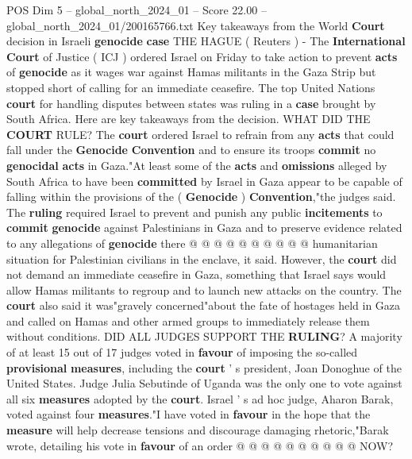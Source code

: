 \begin{textsample}{POS Dim 5 – global\_north\_2024\_01 – Score 22.00 – global\_north\_2024\_01/200165766.txt}  \label{ex:f5_pos_132}
Key takeaways from the World \textbf{Court} decision in Israeli \textbf{genocide} \textbf{case} THE HAGUE ( Reuters ) - The \textbf{International} \textbf{Court} of Justice ( ICJ ) ordered Israel on Friday to take action to prevent \textbf{acts} of \textbf{genocide} as it wages war against Hamas militants in the Gaza Strip but stopped short of calling for an immediate ceasefire.
The top United Nations \textbf{court} for handling disputes between states was ruling in a \textbf{case} brought by South Africa.
Here are key takeaways from the decision.
WHAT DID THE \textbf{COURT} RULE?
The \textbf{court} ordered Israel to refrain from any \textbf{acts} that could fall under the \textbf{Genocide} \textbf{Convention} and to ensure its troops \textbf{commit} no \textbf{genocidal} \textbf{acts} in Gaza."At least some of the \textbf{acts} and \textbf{omissions} alleged by South Africa to have been \textbf{committed} by Israel in Gaza appear to be capable of falling within the provisions of the ( \textbf{Genocide} ) \textbf{Convention},"the judges said.
The \textbf{ruling} required Israel to prevent and punish any public \textbf{incitements} to \textbf{commit} \textbf{genocide} against Palestinians in Gaza and to preserve evidence related to any allegations of \textbf{genocide} there @ @ @ @ @ @ @ @ @ @ humanitarian situation for Palestinian civilians in the enclave, it said.
However, the \textbf{court} did not demand an immediate ceasefire in Gaza, something that Israel says would allow Hamas militants to regroup and to launch new attacks on the country.
The \textbf{court} also said it was"gravely concerned"about the fate of hostages held in Gaza and called on Hamas and other armed groups to immediately release them without conditions.
DID ALL JUDGES SUPPORT THE \textbf{RULING}?
A majority of at least 15 out of 17 judges voted in \textbf{favour} of imposing the so-called \textbf{provisional} \textbf{measures}, including the \textbf{court} ' s president, Joan Donoghue of the United States.
Judge Julia Sebutinde of Uganda was the only one to vote against all six \textbf{measures} adopted by the \textbf{court}.
Israel ' s ad hoc judge, Aharon Barak, voted against four \textbf{measures}."I have voted in \textbf{favour} in the hope that the \textbf{measure} will help decrease tensions and discourage damaging rhetoric,"Barak wrote, detailing his vote in \textbf{favour} of an order @ @ @ @ @ @ @ @ @ @ NOW?

\end{textsample}
